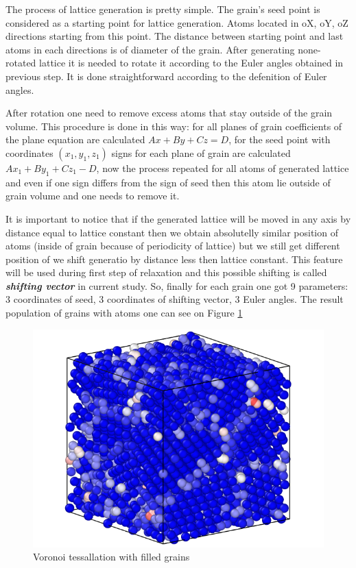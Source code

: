 \documentclass[12pt]{report}
\begin{document}
The process of lattice generation is pretty simple. The grain's seed point is considered as a starting point for lattice generation. Atoms located in oX, oY, oZ directions starting from this point. The distance between starting point and last atoms in each directions is of diameter of the grain. After generating none-rotated lattice it is needed to rotate it according to the Euler angles obtained in previous step. It is done straightforward according to the defenition of Euler angles. 

After rotation one need to remove excess atoms that stay outside of the grain volume. This procedure is done in this way: for all planes of grain coefficients of the plane equation are calculated $Ax + By + Cz = D$, for the seed point with coordinates $(x_1, y_1, z_1)$ signs for each plane of grain are calculated $Ax_1 + By_1 + Cz_1 - D$, now the process repeated for all atoms of generated lattice and even if one sign differs from the sign of seed then this atom lie outside of grain volume and one needs to remove it.

It is important to notice that if the generated lattice will be moved in any axis by distance equal to lattice constant then we obtain absolutelly similar position of atoms (inside of grain because of periodicity of lattice) but we still get different position of we shift generatio by distance less then lattice constant. This feature will be used during first step of relaxation and this possible shifting is called \textit{\textbf{shifting vector}} in current study. So, finally for each grain one got 9 parameters: 3 coordinates of seed, 3 coordinates of shifting vector, 3 Euler angles. The result population of grains with atoms one can see on Figure \ref{cubefilled}

\begin{figure}
    \centering
    \includegraphics[width=5.0in]{cube_filled}
    \caption{Voronoi tessallation with filled grains}
    \label{cubefilled}
\end{figure}
\end{document}
